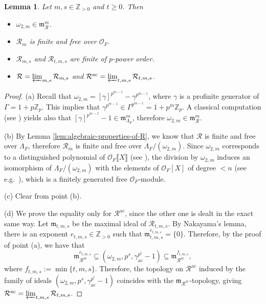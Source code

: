 \documentclass[12pt,reqno]{amsart}
\newtheorem{lemma}[theorem]{Lemma}
\theoremstyle{definition}
\theoremstyle{remark}
\newcommand{\numberset}{\mathbb}
\newcommand{\Z}{\numberset{Z}}
\newcommand{\OF}{\mathcal{O}_F}
\newcommand{\calR}{\mathcal{R}}
\newcommand{\ac}{\mathrm{ac}}
\newcommand{\gL}{\Lambda}
\newcommand{\m}{\mathfrak{m}}
\begin{document}
\begin{lemma}
    Let $m,s\in\Z_{>0}$ and $t\ge 0$. Then
    \begin{itemize}
        \item[(a)] $\omega_{2,m}\in\m_\calR^{m}$.
        \item[(b)] $\calR_m$ is finite and free over $\OF$.
        \item[(c)] $\calR_{m,s}$ and $\calR_{t,m,s}$ are finite of $p$-power order.
        \item[(d)] $\calR=\varprojlim_{m,s}\calR_{m,s}$ and $\calR^{\ac}=\varprojlim_{t,m,s}\calR_{t,m,s}$.
    \end{itemize}
\end{lemma}
\begin{proof}
    (a) Recall that $\omega_{2,m}=[\gamma]^{p^{m-1}}-\gamma^{p^{m-1}}$, where $\gamma$ is a profinite generator of $\Gamma=1+p\Z_p$. This implies that $\gamma^{p^{m-1}}\in \Gamma^{p^{m-1}}=1+p^m\Z_p$. A classical computation (see \cite[p.116]{Washington:cyclotomic-fields}) yields also that $[\gamma]^{p^{m-1}}-1\in \m_{\Lambda_F}^{m}$, therefore $\omega_{2,m}\in\m_\calR^m$. 

    (b) By Lemma \ref{lem:algebraic-properties-of-R}, we know that $\calR$ is finite and free over $\gL_F$, therefore $\calR_m$ is finite and free over $\gL_F/(\omega_{2,m})$. Since $\omega_{2,m}$ corresponds to a distinguished polynomial of $\OF\llbracket X\rrbracket$ (see \cite[p.116]{Washington:cyclotomic-fields}), the division by $\omega_{2,m}$ induces an isomorphism of $\gL_F/(\omega_{2,m})$ with the elements of $\OF[X]$ of degree $<n$ (see e.g.~\cite[Proposition 7.2]{Washington:cyclotomic-fields}), which is a finitely generated free $\OF$-module.

    (c) Clear from point (b).

    (d) We prove the equality only for $\calR^{\ac}$, since the other one is dealt in the exact same way. Let $\m_{t,m,s}$ be the maximal ideal of $\calR_{t,m,s}$. By Nakayama's lemma, there is an exponent $e_{t,m,s}\in\Z_{>0}$ such that $\m_{t,m,s}^{e_{t,m,s}}=\{0\}$. Therefore, by the proof of point (a), we have that
    \begin{equation*}
        \m_{\calR^\ac}^{e_{t,m,s}}\subseteq (\omega_{2,m}, p^s, \gamma_{\ac}^{p^t}-1)\subseteq \m_{\calR^\ac}^{f_{t,m,s}},
    \end{equation*}
    where $f_{t,m,s}:=\min\{t,m,s\}$. Therefore, the topology on $\calR^\ac$ induced by the family of ideals $(\omega_{2,m}, p^s, \gamma_{\ac}^{p^t}-1)$ coincides with the $\m_{\calR^\ac}$-topology, giving $\calR^{\ac}=\varprojlim_{t,m,s}\calR_{t,m,s}$.
\end{proof}
\end{document}

